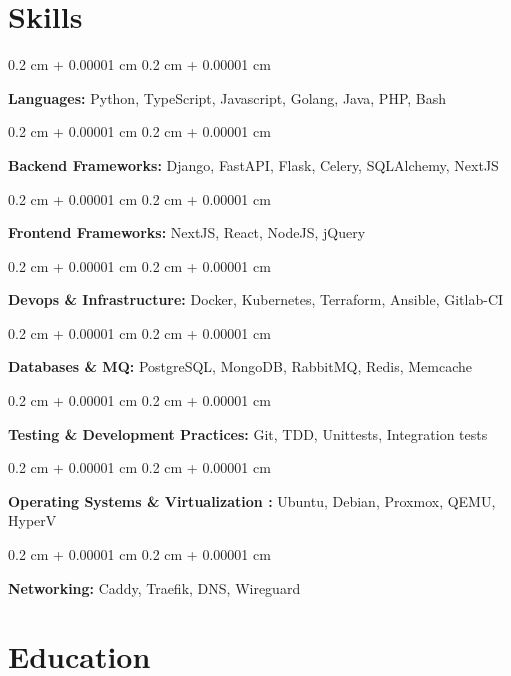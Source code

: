 \documentclass[10pt, letterpaper]{article}
\newcommand\boldblack[1]{\textcolor{strongColor}{\textbf{#1}}}
\newenvironment{onecolentry}{
    \begin{adjustwidth}{
        0.2 cm + 0.00001 cm
    }{
        0.2 cm + 0.00001 cm
    }
}{
    \end{adjustwidth}
} %
\begin{document}
    \section{Skills}
        \begin{onecolentry}
            \boldblack{Languages:} Python, TypeScript, Javascript, Golang, Java, PHP, Bash\end{onecolentry}
        \vspace{0.2 cm}      
        \begin{onecolentry}
            \boldblack{Backend Frameworks:} Django, FastAPI, Flask, Celery, SQLAlchemy, NextJS\end{onecolentry}
        \vspace{0.2 cm}
        \begin{onecolentry}
            \boldblack{Frontend Frameworks:} NextJS, React, NodeJS, jQuery\end{onecolentry}
        \vspace{0.2 cm}
        \begin{onecolentry}
            \boldblack{Devops \& Infrastructure:} Docker, Kubernetes, Terraform, Ansible, Gitlab-CI\end{onecolentry}
        \vspace{0.2 cm}
        \begin{onecolentry}
            \boldblack{Databases \& MQ:} PostgreSQL, MongoDB, RabbitMQ, Redis, Memcache\end{onecolentry}
        \vspace{0.2 cm}
        \begin{onecolentry}
            \boldblack{Testing \& Development Practices:} Git, TDD, Unittests, Integration tests\end{onecolentry}
        \vspace{0.2 cm}
        \begin{onecolentry}
            \boldblack{Operating Systems \& Virtualization :} Ubuntu, Debian, Proxmox, QEMU, HyperV\end{onecolentry}
        \vspace{0.2 cm}
        \begin{onecolentry}
            \boldblack{Networking:} Caddy, Traefik, DNS, Wireguard\end{onecolentry}
        \vspace{0.2 cm}
    
    \section{Education}
        
\end{document}
